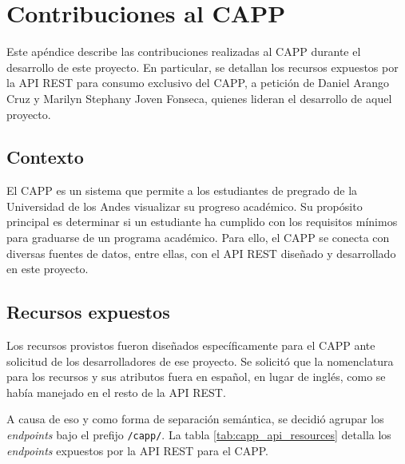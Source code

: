 \chapter{Contribuciones al CAPP}

Este apéndice describe las contribuciones realizadas al \gls{CAPP} durante el desarrollo de este proyecto. En particular, se detallan los recursos expuestos por la \gls{API REST} para consumo exclusivo del \gls{CAPP}, a petición de Daniel Arango Cruz y Marilyn Stephany Joven Fonseca, quienes lideran el desarrollo de aquel proyecto.

\section{Contexto}

El \gls{CAPP} es un sistema que permite a los estudiantes de pregrado de la Universidad de los Andes visualizar su progreso académico. Su propósito principal es determinar si un estudiante ha cumplido con los requisitos mínimos para graduarse de un programa académico. Para ello, el \gls{CAPP} se conecta con diversas fuentes de datos, entre ellas, con el \gls{API REST} diseñado y desarrollado en este proyecto.

\section{Recursos expuestos}

Los recursos provistos fueron diseñados específicamente para el \gls{CAPP} ante solicitud de los desarrolladores de ese proyecto. Se solicitó que la nomenclatura para los recursos y sus atributos fuera en español, en lugar de inglés, como se había manejado en el resto de la \gls{API REST}.

A causa de eso y como forma de separación semántica, se decidió agrupar los \textit{endpoints} bajo el prefijo \lstinline|/capp/|. La tabla \ref{tab:capp_api_resources} detalla los \textit{endpoints} expuestos por la \gls{API REST} para el \gls{CAPP}.

